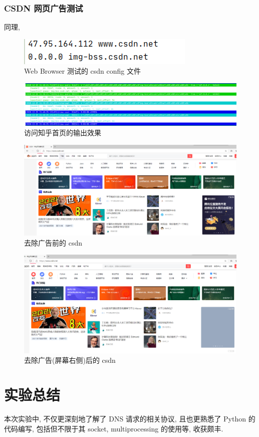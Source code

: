 \documentclass[UTF8]{article}
\begin{document}
\subsubsection{CSDN 网页广告测试}
同理, 
\begin{figure}[H]
	\centering
	\includegraphics[width=\linewidth/3]{csdn_config.png}
	\caption{Web Browser 测试的 csdn config 文件}
\end{figure}\par
\begin{figure}[H]
	\centering
	\includegraphics[width=\linewidth/9*8]{csdn_console.png}
	\caption{访问知乎首页的输出效果}
\end{figure}\par
\begin{figure}[H]
	\centering
	\includegraphics[width=\linewidth/3*2]{csdn.png}
	\caption{去除广告前的 csdn}
\end{figure}\par
\begin{figure}[H]
	\centering
	\includegraphics[width=\linewidth/3*2]{csdn_ad.png}
	\caption{去除广告(屏幕右侧)后的 csdn}
\end{figure}\par

\section{实验总结}
\noindent 本次实验中, 不仅更深刻地了解了 DNS 请求的相关协议, 且也更熟悉了 Python 的代码编写, 包括但不限于其 socket, multiprocessing 的使用等, 收获颇丰.
\end{document}
